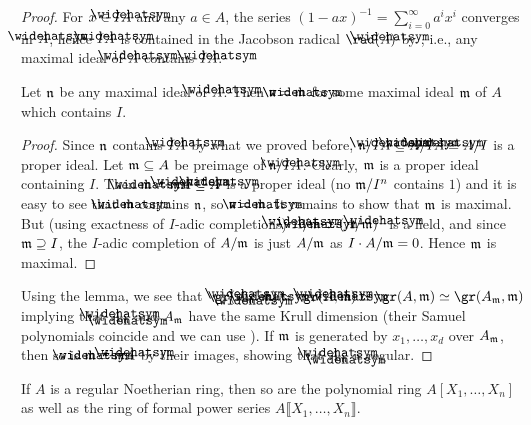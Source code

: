 \documentclass[a4paper,parskip=half,numbers=enddot, DIV=12]{scrreprt}
\begin{document}
\begin{proof}
	For $x\in I\roof{A}$ and any $a\in A$, the series $(1-ax)^{-1}=\sum_{i=0}^{\infty}a^ix^i$ converges in $\roof{A}$, hence $I\roof{A}$ is contained in the Jacobson radical $\rad(\roof{A})$ by \cite[Proposition~1.2.2]{alg2}, i.e., any maximal ideal of $\roof{A}$ contains $I\roof{A}$.  
	\begin{lem}
		Let $\mathfrak{n}$ be any maximal ideal of $\roof{A}$. Then $\nn=\roof{\mm}$ for some maximal ideal $\mathfrak{m}$ of $A$ which contains $I$.
	\end{lem}
	\begin{proof}
		Since $\mathfrak{n}$ contains $I\roof{A}$ by what we proved before, $\nn/I\roof{A}\subseteq \roof{A}/I\roof{A}\simeq A/I$ is a proper ideal. Let $\mathfrak{m}\subseteq A$ be preimage of $\nn/I\roof{A}$. Clearly, $\mathfrak{m}$ is a proper ideal containing $I$. Then $\roof{\mm}=\mm\roof{A}\subseteq \roof{A}$ is a proper ideal (no $\mathfrak{m}/I^n$ contains $1$) and it is easy to see that $\roof{\mm}$ contains $\mathfrak{n}$, so $\nn=\roof{\mm}$. It remains to show that $\mathfrak{m}$ is maximal. But (using exactness of $I$-adic completions) $\roof{A}/\roof{\mm}\simeq (A/\mm)\roof{\phantom{)}}$ is a field, and since $\mathfrak{m}\supseteq I$, the $I$-adic completion of $A/\mathfrak{m}$ is just $A/\mathfrak{m}$ as $I\cdot A/\mathfrak{m}=0$. Hence $\mathfrak{m}$ is maximal.
	\end{proof}
	
	Using the lemma, we see that $\gr(\roof{A}_{\roof{\mm}},\roof{\mm})\simeq\gr(\roof{A},\roof{\mm})\simeq \gr(A,\mm)\simeq\gr(A_\mm,\mm)$ implying that $\roof{A}_{\roof{\mm}}$ and $A_{\mathfrak{m}}$ have the same Krull dimension (their Samuel polynomials coincide and we can use \cite[Theorem~20]{alg2}). If $\mathfrak{m}$ is generated by $x_1,\ldots,x_d$ over $A_{\mathfrak{m}}$, then so is $\roof{\mm}\simeq\mm\roof{A}$ by their images, showing that $\roof{A}_{\roof{\mm}}$ is regular.
\end{proof}
\begin{prop}
	If $A$ is a regular Noetherian ring, then so are the polynomial ring $A[X_1,\ldots,X_n]$ as well as the ring of formal power series $A\llbracket X_1,\ldots,X_n\rrbracket$.
\end{prop}
\end{document}
